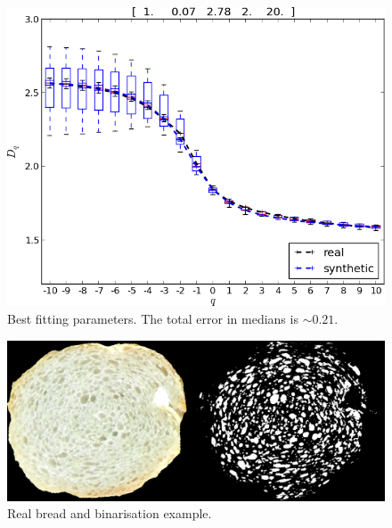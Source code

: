 \documentclass[final,5p,times]{elsarticle}
\begin{document}
{\begin{figure}[!ht]
\includegraphics[scale=0.5]{bestboxplot.png}
\caption{Best fitting parameters. The total error in medians is $\sim 0.21$.}
\label{bestboxplot}
\end{figure}

\begin{figure}[!ht]
\begin{center}
\includegraphics[scale=0.2]{realbin.png}
\caption{ Real bread and binarisation example.}
\label{realbin}
\end{center}
\end{figure}

}
\end{document}
